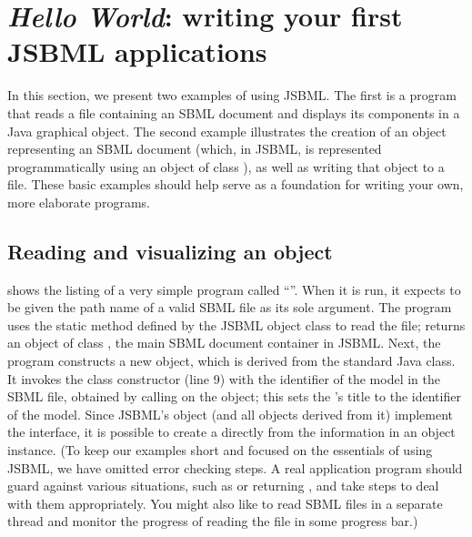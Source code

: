 
\section[Writing your first JSBML application]{\emph{Hello World}: writing your first JSBML applications}
\label{sec:hello-world}

In this section, we present two examples of using JSBML. The first is a
program that reads a file containing an SBML document and displays its
components in a Java \JTree graphical object. The second example
illustrates the creation of an object representing an SBML document (which,
in JSBML, is represented programmatically using an object of class
\SBMLDocument), as well as writing that object to a file. These basic
examples should help serve as a foundation for writing your own, more
elaborate programs.


\subsection{Reading and visualizing an  object}

 shows the listing of a very simple
program called ``''. When it is run, it expects to
be given the path name of a valid SBML file as  its
sole argument. The program uses the static method  defined
by the JSBML object class \SBMLReader to read the file; \SBMLReader
returns an object of class \SBMLDocument, the main SBML document
container in JSBML.  Next, the program constructs a new
 object, which is derived from the standard Java
\JFrame class. It invokes the class constructor (line 9) with the
identifier of the model in the SBML file, obtained by calling
 on the \SBMLDocument object; this sets the
\JFrame's title to the identifier of the model. Since JSBML's \SBase
object (and all objects derived from it) implement the \TreeNode
interface, it is possible to create a \JTree directly from the
information in an \SBMLDocument object instance.  (To keep our examples
short and focused on the essentials of using JSBML, we have omitted
error checking steps.  A real application program should guard against
various situations, such as  or  returning , and
take steps to deal with them appropriately. You might also like to read SBML files 
in a separate thread and monitor the progress of reading the file in some progress bar.)


